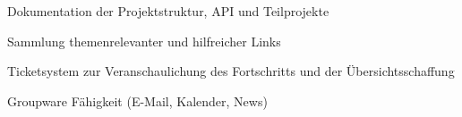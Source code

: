 \begin{frame}
\begin{block}{}
	Dokumentation der Projektstruktur, API und Teilprojekte
\end{block}
\begin{block}{}
	Sammlung themenrelevanter und hilfreicher Links
\end{block}
\begin{block}{}
	Ticketsystem zur Veranschaulichung des Fortschritts und der Übersichtsschaffung
\end{block}
\begin{block}{}
	Groupware Fähigkeit (E-Mail, Kalender, News)
\end{block}
\end{frame}
